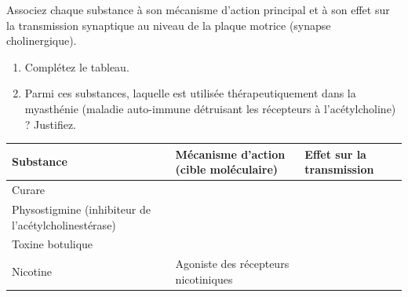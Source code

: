 \documentclass[11pt]{article}
\begin{document}
\begin{exercice}
Associez chaque substance à son mécanisme d'action principal et à son effet sur la transmission synaptique au niveau de la plaque motrice (synapse cholinergique).
\begin{enumerate}
    \item Complétez le tableau.
    \item Parmi ces substances, laquelle est utilisée thérapeutiquement dans la myasthénie (maladie auto-immune détruisant les récepteurs à l'acétylcholine) ? Justifiez.
\end{enumerate}
\begin{tabularx}{\linewidth}{|X|X|X|}
\hline
\textbf{Substance} & \textbf{Mécanisme d'action (cible moléculaire)} & \textbf{Effet sur la transmission} \\
\hline
Curare &  &  \\
\hline
Physostigmine (inhibiteur de l'acétylcholinestérase) &  &  \\
\hline
Toxine botulique &  &  \\
\hline
Nicotine & Agoniste des récepteurs nicotiniques &  \\
\hline
\end{tabularx}
\end{exercice}
\end{document}
